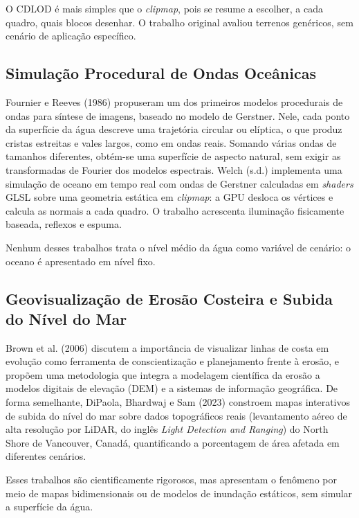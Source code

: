 \documentclass[conference]{IEEEtran}
\begin{document}
O CDLOD é mais simples que o \emph{clipmap}, pois se resume a escolher, a
cada quadro, quais blocos desenhar. O trabalho original avaliou terrenos
genéricos, sem cenário de aplicação específico.

\subsection{Simulação Procedural de Ondas Oceânicas}
\label{sub:ondas-rel}

Fournier e Reeves (1986) propuseram um dos primeiros modelos procedurais de
ondas para síntese de imagens, baseado no modelo de Gerstner. Nele, cada
ponto da superfície da água descreve uma trajetória circular ou elíptica, o
que produz cristas estreitas e vales largos, como em ondas reais. Somando
várias ondas de tamanhos diferentes, obtém-se uma superfície de aspecto
natural, sem exigir as transformadas de Fourier dos modelos espectrais. Welch (s.d.)
implementa uma simulação de oceano em tempo real com ondas de Gerstner
calculadas em \emph{shaders} GLSL sobre uma geometria estática em
\emph{clipmap}: a GPU desloca os vértices e calcula as normais a cada quadro.
O trabalho acrescenta iluminação fisicamente baseada, reflexos e espuma.

Nenhum desses trabalhos trata o nível médio da água como variável de
cenário: o oceano é apresentado em nível fixo.

\subsection{Geovisualização de Erosão Costeira e Subida do Nível do Mar}
\label{sub:geovis}

Brown et al. (2006) discutem a importância de visualizar linhas de costa em
evolução como ferramenta de conscientização e planejamento frente à erosão,
e propõem uma metodologia que integra a modelagem científica da erosão a
modelos digitais de elevação (DEM) e a sistemas de informação geográfica.
De forma semelhante, DiPaola, Bhardwaj e Sam (2023) constroem mapas
interativos de subida do nível do mar sobre dados topográficos reais
(levantamento aéreo de alta resolução por LiDAR, do inglês \emph{Light
Detection and Ranging}) do North Shore de Vancouver, Canadá,
quantificando a porcentagem de área afetada em diferentes cenários.

Esses trabalhos são cientificamente rigorosos, mas apresentam o fenômeno por
meio de mapas bidimensionais ou de modelos de inundação estáticos, sem
simular a superfície da água.
\end{document}

